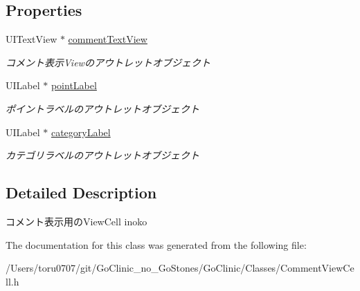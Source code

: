\subsection*{Properties}
\begin{DoxyCompactItemize}
\item 
\hypertarget{interface_comment_view_cell_af57f6a409c565d37717bd11bd29711aa}{
UITextView $\ast$ \hyperlink{interface_comment_view_cell_af57f6a409c565d37717bd11bd29711aa}{commentTextView}}
\label{interface_comment_view_cell_af57f6a409c565d37717bd11bd29711aa}

\begin{DoxyCompactList}\small\item\em コメント表示Viewのアウトレットオブジェクト \end{DoxyCompactList}\item 
\hypertarget{interface_comment_view_cell_a2cd31e157cc9e6139da1343fe5c48feb}{
UILabel $\ast$ \hyperlink{interface_comment_view_cell_a2cd31e157cc9e6139da1343fe5c48feb}{pointLabel}}
\label{interface_comment_view_cell_a2cd31e157cc9e6139da1343fe5c48feb}

\begin{DoxyCompactList}\small\item\em ポイントラベルのアウトレットオブジェクト \end{DoxyCompactList}\item 
\hypertarget{interface_comment_view_cell_a4ed6a62da88abead5dfb3cdf260205af}{
UILabel $\ast$ \hyperlink{interface_comment_view_cell_a4ed6a62da88abead5dfb3cdf260205af}{categoryLabel}}
\label{interface_comment_view_cell_a4ed6a62da88abead5dfb3cdf260205af}

\begin{DoxyCompactList}\small\item\em カテゴリラベルのアウトレットオブジェクト \end{DoxyCompactList}\end{DoxyCompactItemize}


\subsection{Detailed Description}
コメント表示用のViewCell  inoko 

The documentation for this class was generated from the following file:\begin{DoxyCompactItemize}
\item 
/Users/toru0707/git/GoClinic\_\-no\_\-GoStones/GoClinic/Classes/CommentViewCell.h\end{DoxyCompactItemize}
